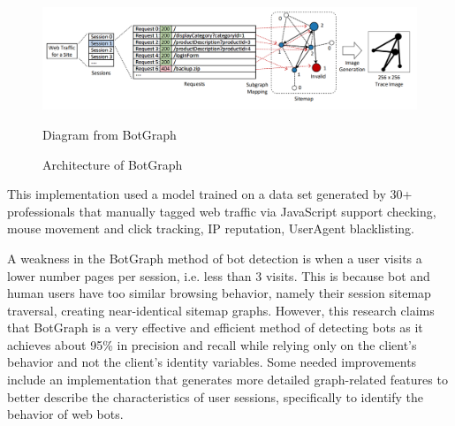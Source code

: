 \begin{figure}[!h]
    \centering
    \includegraphics[width=1\columnwidth]{figures/BotGraph_fig1}
    \caption{Architecture of BotGraph}
    {\small Diagram from BotGraph~\cite{botgraph}}
    \label{fig:botgraph}
\end{figure}
This implementation used a model trained on a data set generated by 30+ professionals that manually tagged web traffic via JavaScript support checking, mouse movement and click tracking, IP reputation, UserAgent blacklisting.

A weakness in the BotGraph method of bot detection is when a user visits a lower number pages per session, i.e. less than 3 visits.
This is because bot and human users have too similar browsing behavior, namely their session sitemap traversal, creating near-identical sitemap graphs.
However, this research claims that BotGraph is a very effective and efficient method of detecting bots as it achieves about 95\% in precision and recall while relying only on the client's behavior and not the client's identity variables.
Some needed improvements include an implementation that generates more detailed graph-related features to better describe the characteristics of user sessions, specifically to identify the behavior of web bots.

